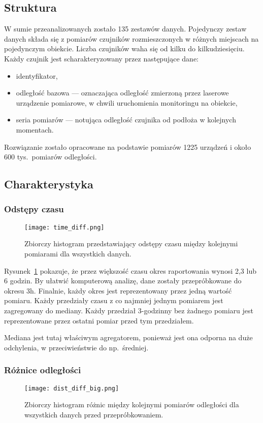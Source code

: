 \subsection{Struktura}\label{subsec:struktura}
W sumie przeanalizowanych zostało 135 zestawów danych.
Pojedynczy zestaw danych składa się z pomiarów czujników rozmieszczonych w różnych miejscach na pojedynczym obiekcie.
Liczba czujników waha się od kilku do kilkudziesięciu.
Każdy czujnik jest scharakteryzowany przez następujące dane:
\begin{itemize}
    \item identyfikator,
    \item odległość bazowa — oznaczająca odległość zmierzoną przez laserowe urządzenie pomiarowe, w chwili uruchomienia monitoringu na obiekcie,
    \item seria pomiarów — notująca odległość czujnika od podłoża w kolejnych momentach.
\end{itemize}
Rozwiązanie zostało opracowane na podstawie pomiarów 1225 urządzeń i około 600 tys.\ pomiarów odległości.

\subsection{Charakterystyka}\label{subsec:charakterystyka}

\subsubsection{Odstępy czasu}
\begin{figure}[h]
    \texttt{[image: time\_diff.png]}
    \caption{Zbiorczy histogram przedstawiający odstępy czasu między kolejnymi pomiarami dla wszystkich danych.}\label{fig:odstepyczasu}
\end{figure}

Rysunek~\ref{fig:odstepyczasu} pokazuje, że przez większość czasu okres raportowania wynosi 2,3 lub 6 godzin.
By ułatwić komputerową analizę, dane zostały przepróbkowane do okresu 3h.
Finalnie, każdy okres jest reprezentowany przez jedną wartość pomiaru.
Każdy przedziały czasu z co najmniej jednym pomiarem jest zagregowany do mediany.
Każdy przedział 3-godzinny bez żadnego pomiaru jest reprezentowane przez ostatni pomiar przed tym przedziałem.

Mediana jest tutaj właściwym agregatorem, ponieważ jest ona odporna na duże odchylenia, w przeciwieństwie do np.\ średniej.

\subsubsection{Różnice odległości}
\begin{figure}[h]
    \texttt{[image: dist\_diff\_big.png]}\caption{Zbiorczy histogram różnic między kolejnymi pomiarów odległości dla wszystkich danych przed przepróbkowaniem.}
    \label{fig:distbig}
\end{figure}

